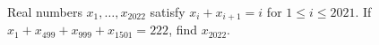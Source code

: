 Real numbers $x_1,\ldots,x_{2022}$ satisfy $x_i+x_{i+1}=i$ for $1\le i\le2021$. If $x_1+x_{499}+x_{999}+x_{1501}=222$, find $x_{2022}$.
